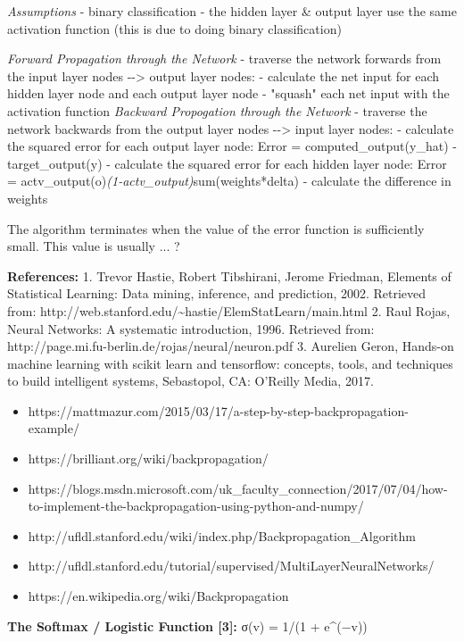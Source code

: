 \documentclass[11pt]{article}
\begin{document}
\emph{Assumptions} - binary classification - the hidden layer \& output
layer use the same activation function (this is due to doing binary
classification)

\emph{Forward Propagation through the Network} - traverse the network
forwards from the input layer nodes -\/-\textgreater{} output layer
nodes: - calculate the net input for each hidden layer node and each
output layer node - "squash" each net input with the activation function
\emph{Backward Propogation through the Network} - traverse the network
backwards from the output layer nodes -\/-\textgreater{} input layer
nodes: - calculate the squared error for each output layer node: Error =
computed\_output(y\_hat) - target\_output(y) - calculate the squared
error for each hidden layer node: Error =
actv\_output(o)\emph{(1-actv\_output)}sum(weights*delta) - calculate the
difference in weights

The algorithm terminates when the value of the error function is
sufficiently small. This value is usually ... ?

\textbf{References:} 1. Trevor Hastie, Robert Tibshirani, Jerome
Friedman, Elements of Statistical Learning: Data mining, inference, and
prediction, 2002. Retrieved from:
http://web.stanford.edu/\textasciitilde{}hastie/ElemStatLearn/main.html
2. Raul Rojas, Neural Networks: A systematic introduction, 1996.
Retrieved from: http://page.mi.fu-berlin.de/rojas/neural/neuron.pdf 3.
Aurelien Geron, Hands-on machine learning with scikit learn and
tensorflow: concepts, tools, and techniques to build intelligent
systems, Sebastopol, CA: O'Reilly Media, 2017.

\begin{itemize}
\item
  https://mattmazur.com/2015/03/17/a-step-by-step-backpropagation-example/
\item
  https://brilliant.org/wiki/backpropagation/
\item
  https://blogs.msdn.microsoft.com/uk\_faculty\_connection/2017/07/04/how-to-implement-the-backpropagation-using-python-and-numpy/
\item
  http://ufldl.stanford.edu/wiki/index.php/Backpropagation\_Algorithm
\item
  http://ufldl.stanford.edu/tutorial/supervised/MultiLayerNeuralNetworks/
\item
  https://en.wikipedia.org/wiki/Backpropagation
\end{itemize}

    \textbf{The Softmax / Logistic Function {[}3{]}:} σ(v) = 1/(1 +
e\^{}(−v))
\end{document}
